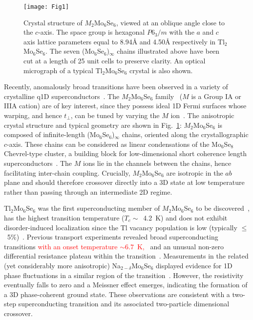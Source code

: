 \documentclass[prb,twocolumn,showpacs,preprintnumbers,amsmath,amssymb,floatfix,groupedaddress,superscriptaddress,aps,10pt]{revtex4-1}
\newcommand{\Tl}{Tl$_2$Mo$_6$Se$_6$}
\newcommand{\Na}{Na$_{2-\delta}$Mo$_6$Se$_6$}
\newcommand{\MMoSe}{$M_2$Mo$_6$Se$_6$}
\begin{document}
\begin{figure}[tb]
	\centering 
	\texttt{[image: Fig1]}
	\caption{\label{Fig1} Crystal structure of $M_2$Mo$_6$Se$_6$, viewed at an oblique angle close to the $c$-axis. The space group is hexagonal $P6_3/m$ with the $a$ and $c$ axis lattice parameters equal to 8.94{\AA} and 4.50{\AA} respectively in Tl$_2$Mo$_6$Se$_6$.  The seven (Mo$_6$Se$_6$)$_\infty$ chains illustrated above have been cut at a length of 25 unit cells to preserve clarity.   An optical micrograph of a typical Tl$_2$Mo$_6$Se$_6$ crystal is also shown.}
\end{figure}

Recently, anomalously broad transitions have been observed in a variety of crystalline q1D superconductors~\cite{Petrovic2007,Petrovic2010,Bergk2011,He2015,Ansermet2016,Tsuchiya2017}. The {\MMoSe} family~\cite{Potel1980} ($M$ is a Group IA or IIIA cation) are of key interest, since they possess ideal 1D Fermi surfaces whose warping, and hence $t_\perp$, can be tuned by varying the $M$ ion~\cite{Petrovic2010,Petrovic2016,Liu2017}. The anisotropic crystal structure and typical geometry are shown in Fig.~\ref{Fig1}: {\MMoSe} is composed of infinite-length (Mo$_6$Se$_6$)$_\infty$ chains, oriented along the crystallographic $c$-axis.  These chains can be considered as linear condensations of the Mo$_6$Se$_8$ Chevrel-type cluster, a building block for low-dimensional short coherence length superconductors~\cite{Fischer1978,Pena2015}. The $M$ ions lie in the channels between the chains, hence facilitating inter-chain coupling.  Crucially, {\MMoSe} are isotropic in the $ab$ plane and should therefore crossover directly into a 3D state at low temperature rather than passing through an intermediate 2D regime.  

{\Tl} was the first superconducting member of {\MMoSe} to be discovered~\cite{Armici1980a}, has the highest transition temperature ($T_c\sim$~4.2~K) and does not exhibit disorder-induced localization since the Tl vacancy population is low (typically $\leq$~5\%)~\cite{Petrovic2016}.  Previous transport experiments revealed broad superconducting transitions \textcolor{red}{with an onset temperature $\sim6.7$~K,}~\cite{Petrovic2007,Petrovic2010,Bergk2011} and an unusual non-zero differential resistance plateau within the transition~\cite{Bergk2011}. Measurements in the related (yet considerably more anisotropic) {\Na} displayed evidence for 1D phase fluctuations in a similar region of the transition~\cite{Ansermet2016}.  However, the resistivity eventually falls to zero and a Meissner effect emerges, indicating the formation of a 3D phase-coherent ground state.  These observations are consistent with a two-step superconducting transition and its associated two-particle dimensional crossover.
\end{document}
